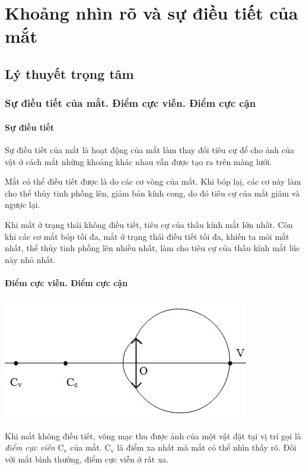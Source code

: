 \chapter{Khoảng nhìn rõ và sự điều tiết của mắt}
\section{Lý thuyết trọng tâm}

\subsection{Sự điều tiết của mắt. Điểm cực viễn. Điểm cực cận}
\subsubsection{Sự điều tiết}
	Sự điều tiết của mắt là hoạt động của mắt làm thay đổi tiêu cự để cho ảnh của vật ở cách mắt những khoảng khác nhau vẫn được tạo ra trên màng lưới. 
	
	Mắt có thể điều tiết được là do các cơ vòng của mắt. Khi bóp lạị, các cơ này làm cho thể thủy tinh phồng lên, giảm bán kính cong, do đó tiêu cự của mắt giảm và ngược lại.
	
	Khi mắt ở trạng thái không điều tiết, tiêu cự của thấu kính mắt lớn nhất. Còn khi các cơ mắt bóp tối đa, mắt ở trạng thái điều tiết tối đa, khiến ta mỏi mắt nhất, thể thủy tinh phồng lên nhiều nhất, làm cho tiêu cự của thấu kính mắt lúc này nhỏ nhất.
	
\subsubsection{Điểm cực viễn. Điểm cực cận}
\begin{center}
	\includegraphics[scale=0.8]{../figs/VN11-PH-40-L-028-2-h34.jpg}
\end{center}

Khi mắt không điều tiết, võng mạc thu được ảnh của một vật đặt tại vị trí gọi là \textit{điểm cực viễn} $\text{C}_\text{v}$ của mắt. $\text{C}_\text{v}$ là điểm xa nhất mà mắt có thể nhìn thấy rõ. Đối với mắt bình thường, điểm cực viễn ở rất xa. 
	
